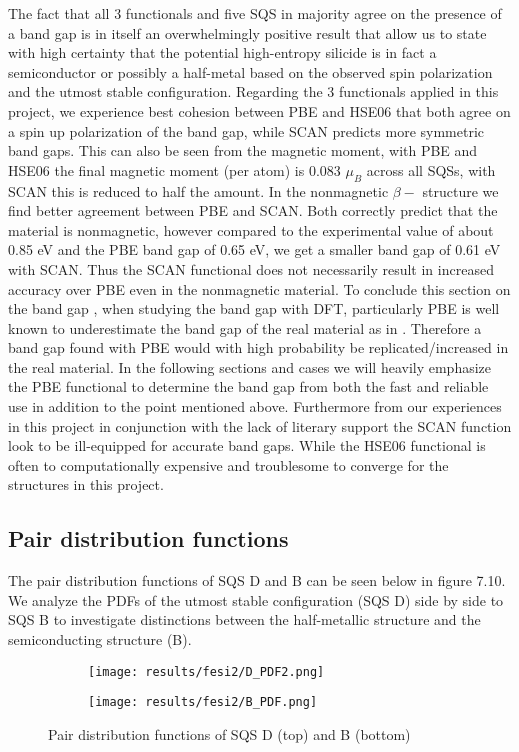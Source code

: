 The fact that all 3 functionals and five SQS in majority agree on the presence of a band gap is in itself an overwhelmingly positive result that allow us to state with high certainty that the potential high-entropy silicide  is in fact a semiconductor or possibly a half-metal based on the observed spin polarization and the utmost stable configuration. Regarding the 3 functionals applied in this project, we experience best cohesion between PBE and HSE06 that both agree on a spin up polarization of the band gap, while SCAN predicts more symmetric band gaps. This can also be seen from the magnetic moment, with PBE and HSE06 the final magnetic moment (per atom) is 0.083 $\mu_B$ across all SQSs, with SCAN this is reduced to half the amount. In the nonmagnetic $\beta-$  structure we find better agreement between PBE and SCAN. Both correctly predict that the material is nonmagnetic, however compared to the experimental value of about 0.85 eV and the PBE band gap of 0.65 eV, we get a smaller band gap of 0.61 eV with SCAN. Thus the SCAN functional does not necessarily result in increased accuracy over PBE even in the nonmagnetic material. To conclude this section on the band gap , when studying the band gap with DFT, particularly PBE is well known to underestimate the band gap of the real material as in . Therefore a band gap found with PBE would with high probability be replicated/increased in the real material. In the following sections and cases we will heavily emphasize the PBE functional to determine the band gap from both the fast and reliable use in addition to the point mentioned above. Furthermore from our experiences in this project in conjunction with the lack of literary support the SCAN function look to be ill-equipped for accurate band gaps. While the HSE06 functional is often to computationally expensive and troublesome to converge for the structures in this project.
 
\subsection{Pair distribution functions}
The pair distribution functions of SQS D and B can be seen below in figure 7.10. We analyze the PDFs of the utmost stable configuration (SQS D) side by side to SQS B to investigate distinctions between the half-metallic structure and the semiconducting structure (B). 
 
\begin{figure}[H]
	\centering
	\begin{subfigure}{\textwidth}
		\texttt{[image: results/fesi2/D\_PDF2.png]}
	\end{subfigure}
	\begin{subfigure}{\textwidth}
		\texttt{[image: results/fesi2/B\_PDF.png]}
	\end{subfigure}
	\caption{Pair distribution functions of SQS D (top) and B (bottom)}
\end{figure}

